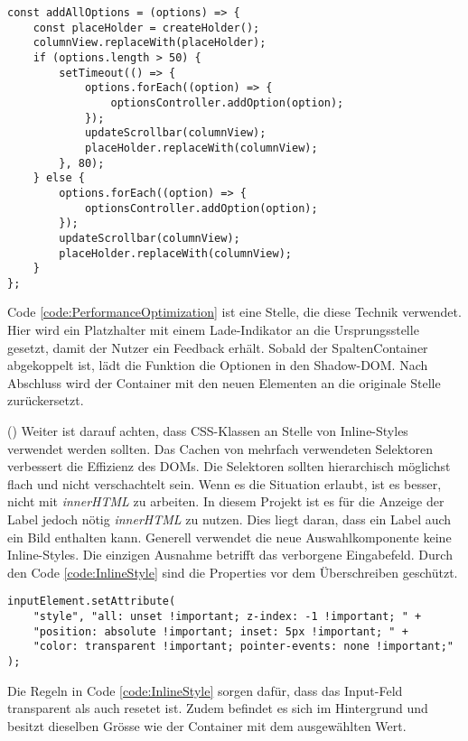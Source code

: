 \begin{lstlisting}[style = htmlcssjs, caption = Performance Optimierung (columnOptionsComponent.js), label = code:PerformanceOptimization]
const addAllOptions = (options) => {
    const placeHolder = createHolder();
    columnView.replaceWith(placeHolder);
    if (options.length > 50) {
        setTimeout(() => {
            options.forEach((option) => {
                optionsController.addOption(option);
            });
            updateScrollbar(columnView);
            placeHolder.replaceWith(columnView);
        }, 80);
    } else {
        options.forEach((option) => {
            optionsController.addOption(option);
        });
        updateScrollbar(columnView);
        placeHolder.replaceWith(columnView);
    }
};
\end{lstlisting}

Code \ref{code:PerformanceOptimization} ist eine Stelle, die diese Technik verwendet.
Hier wird ein Platzhalter mit einem Lade-Indikator an die Ursprungsstelle gesetzt, damit der Nutzer ein Feedback erhält.
Sobald der SpaltenContainer abgekoppelt ist, lädt die Funktion die Optionen in den Shadow-DOM.
Nach Abschluss wird der Container mit den neuen Elementen an die originale Stelle zurückersetzt.

(\cite{efficientDomManipulation}) Weiter ist darauf achten, dass CSS-Klassen an Stelle von Inline-Styles verwendet werden sollten.
Das Cachen von mehrfach verwendeten Selektoren verbessert die Effizienz des DOMs.
Die Selektoren sollten hierarchisch möglichst flach und nicht verschachtelt sein.
Wenn es die Situation erlaubt, ist es besser, nicht mit \emph{innerHTML} zu arbeiten.
In diesem Projekt ist es für die Anzeige der Label jedoch nötig \emph{innerHTML} zu nutzen.
Dies liegt daran, dass ein Label auch ein Bild enthalten kann.
Generell verwendet die neue Auswahlkomponente keine Inline-Styles.
Die einzigen Ausnahme betrifft das verborgene Eingabefeld. 
Durch den Code \ref{code:InlineStyle} sind die Properties vor dem Überschreiben geschützt.

\begin{lstlisting}[style = htmlcssjs, caption = Inline-Style für Inputfeld, label = code:InlineStyle]
inputElement.setAttribute(
    "style", "all: unset !important; z-index: -1 !important; " +
    "position: absolute !important; inset: 5px !important; " +
    "color: transparent !important; pointer-events: none !important;"
);
\end{lstlisting}

Die Regeln in Code \ref{code:InlineStyle} sorgen dafür, dass das Input-Feld transparent als auch resetet ist.
Zudem befindet es sich im Hintergrund und besitzt dieselben Grösse wie der Container mit dem ausgewählten Wert.

